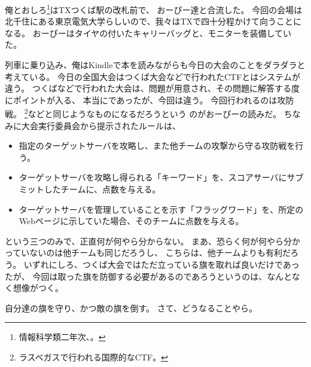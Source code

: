 俺とおしろ\footnote{情報科学類二年次、。}はTXつくば駅の改札前で、
おーぴー達と合流した。
今回の会場は北千住にある東京電気大学らしいので、我々はTXで四十分程かけて向うことになる。
おーぴーはタイヤの付いたキャリーバッグと、モニターを装備していた。

列車に乗り込み、俺はKindleで本を読みながらも今日の大会のことをダラダラと考えている。
今日の全国大会はつくば大会などで行われたCTFとはシステムが違う。
つくばなどで行われた大会は、問題が用意され、その問題に解答する度にポイントが入る、
本当にであったが、今回は違う。
今回行われるのは攻防戦。
\DEFCON\footnote{ラスベガスで行われる国際的なCTF。}などと同じようなものになるだろうという
のがおーぴーの読みだ。
ちなみに大会実行委員会から提示されたルールは、

\begin{itemize}
	\item 指定のターゲットサーバを攻略し、また他チームの攻撃から守る攻防戦を行う。
	\item ターゲットサーバを攻略し得られる「キーワード」を、スコアサーバにサブミットしたチームに、点数を与える。
	\item ターゲットサーバを管理していることを示す「フラッグワード」を、所定のWebページに示していた場合、そのチームに点数を与える。
\end{itemize}

という三つのみで、正直何が何やら分からない。
まあ、恐らく何が何やら分かっていないのは他チームも同じだろうし、
こちらは、他チームよりも有利だろう。
いずれにしろ、つくば大会ではただ立っている旗を取れば良いだけであったが、
今回は取った旗を防御する必要があるのであろうというのは、なんとなく想像がつく。

自分達の旗を守り、かつ敵の旗を倒す。
さて、どうなることやら。
